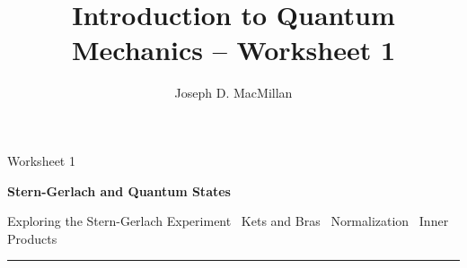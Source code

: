 \documentclass[10pt, letterpaper, twoside, openany]{article}
\title{Introduction to Quantum Mechanics -- Worksheet 1}
\author{Joseph D. MacMillan}
\date{}
\begin{document}
\pagestyle{fancy}

\Large \noindent Worksheet 1

\noindent \LARGE \textbf{Stern-Gerlach and Quantum States}

\normalsize

\vspace{0.2in}

\noindent Exploring the Stern-Gerlach Experiment  \bullet \  Kets and Bras   \bullet \  Normalization   \bullet \  Inner Products  

\vspace{0.1in}

\noindent \rule{\textwidth}{0.5pt}

\vspace{0.2in}
\end{document}
